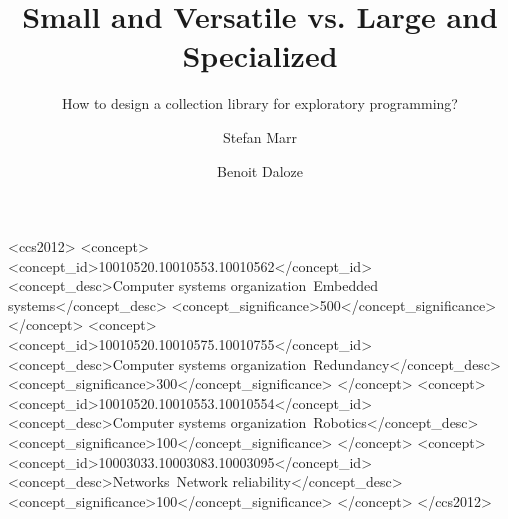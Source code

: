 \documentclass[sigconf, 10pt]{acmart}
\def\Title{Small and Versatile vs. Large and Specialized}
\def\SubTitle{How to design a collection library for exploratory programming?}
\begin{document}
\title{\Title}
\subtitle{\SubTitle}

\author{Stefan Marr}

\author{Benoit Daloze}




\begin{abstract}


\end{abstract}

%
%
\begin{CCSXML}
<ccs2012>
 <concept>
  <concept_id>10010520.10010553.10010562</concept_id>
  <concept_desc>Computer systems organization~Embedded systems</concept_desc>
  <concept_significance>500</concept_significance>
 </concept>
 <concept>
  <concept_id>10010520.10010575.10010755</concept_id>
  <concept_desc>Computer systems organization~Redundancy</concept_desc>
  <concept_significance>300</concept_significance>
 </concept>
 <concept>
  <concept_id>10010520.10010553.10010554</concept_id>
  <concept_desc>Computer systems organization~Robotics</concept_desc>
  <concept_significance>100</concept_significance>
 </concept>
 <concept>
  <concept_id>10003033.10003083.10003095</concept_id>
  <concept_desc>Networks~Network reliability</concept_desc>
  <concept_significance>100</concept_significance>
 </concept>
</ccs2012>
\end{CCSXML}


\end{document}
